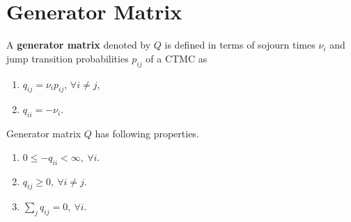 \documentclass[a4paper,10pt,english]{article}
\begin{document}
\section{Generator Matrix}
\begin{defn}
A \textbf{generator matrix} denoted by $Q$ is defined in terms of sojourn times $\nu_i$ and jump transition probabilities $p_{ij}$ of a CTMC as
\begin{enumerate}
\item {$q_{ij}=\nu_i p_{ij}$, $\forall i \neq j$, } 
\item { $q_{ii}= -\nu_i$.}
\end{enumerate}
\end{defn}
\begin{lem} Generator matrix $Q$ has following properties.
 \begin{enumerate}
\item {$0 \leq -q_{ii} < \infty,~ \forall i$.} 
\item { $q_{ij} \geq 0,~ \forall i \neq j$.}
\item { $\sum_{j}q_{ij}=0,~ \forall i$.}
\end{enumerate}
\end{lem}
\end{document}
